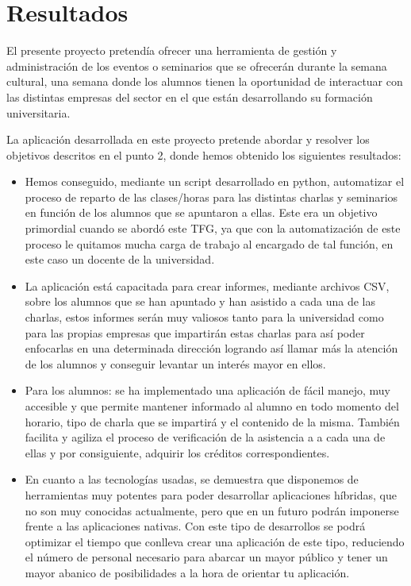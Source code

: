 \documentclass[a4paper, 12pt]{book}
\begin{document}
\cleardoublepage
\chapter{Resultados}

El presente proyecto pretendía ofrecer una herramienta de gestión y administración de los eventos o seminarios que se ofrecerán durante la semana cultural, una semana donde los alumnos tienen la oportunidad de interactuar con las distintas empresas del sector en el que están desarrollando su formación universitaria.

La aplicación desarrollada en este proyecto pretende abordar y resolver los objetivos descritos en el punto 2, donde hemos obtenido los siguientes resultados:

\begin{itemize}
  \item Hemos conseguido, mediante un script desarrollado en python, automatizar el proceso de reparto de las clases/horas para las distintas charlas y seminarios en función de los alumnos que se apuntaron a ellas. Este era un objetivo primordial cuando se abordó este TFG, ya que con la automatización de este proceso le quitamos mucha carga de trabajo al encargado de tal función, en este caso un docente de la universidad.
  
  \item La aplicación está capacitada para crear informes, mediante archivos CSV, sobre los alumnos que se han apuntado y han asistido a cada una de las charlas, estos informes serán muy valiosos tanto para la universidad como para las propias empresas que impartirán estas charlas para así poder enfocarlas en una determinada dirección logrando así llamar más la atención de los alumnos y conseguir levantar un interés mayor en ellos.
   
   \item Para los alumnos: se ha implementado una aplicación de fácil manejo, muy accesible y que permite mantener informado al alumno en todo momento del horario, tipo de charla que se impartirá y el contenido de la misma. También facilita y agiliza el proceso de verificación de la asistencia a a cada una de ellas y por consiguiente, adquirir los créditos correspondientes.
   
   \item En cuanto a las tecnologías usadas, se demuestra que disponemos de herramientas muy potentes para poder desarrollar aplicaciones híbridas, que no son muy conocidas actualmente, pero que en un futuro podrán imponerse frente a las aplicaciones nativas. Con este tipo de desarrollos se podrá optimizar el tiempo que conlleva crear una aplicación de este tipo, reduciendo el número de personal necesario para abarcar un mayor público y tener un mayor abanico de posibilidades a la hora de orientar tu aplicación.
\end{itemize}
\end{document}
